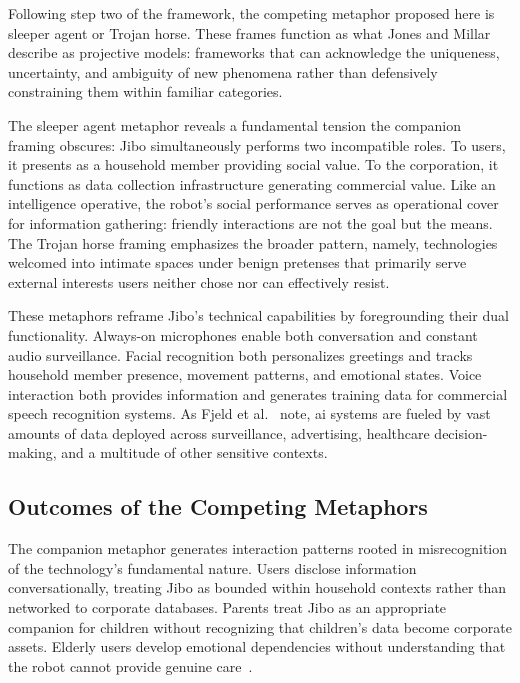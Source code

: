 \documentclass{ieee-portfolio}
\begin{document}
Following step two of the framework, the competing metaphor proposed here is sleeper agent or Trojan horse. These frames function as what Jones and Millar~\cite{jones_hacking_2017} describe as projective models: frameworks that can acknowledge the uniqueness, uncertainty, and ambiguity of new phenomena rather than defensively constraining them within familiar categories.

The sleeper agent metaphor reveals a fundamental tension the companion framing obscures: Jibo simultaneously performs two incompatible roles. To users, it presents as a household member providing social value. To the corporation, it functions as data collection infrastructure generating commercial value. Like an intelligence operative, the robot's social performance serves as operational cover for information gathering: friendly interactions are not the goal but the means. The Trojan horse framing emphasizes the broader pattern, namely, technologies welcomed into intimate spaces under benign pretenses that primarily serve external interests users neither chose nor can effectively resist.

These metaphors reframe Jibo's technical capabilities by foregrounding their dual functionality. Always-on microphones enable both conversation and constant audio surveillance. Facial recognition both personalizes greetings and tracks household member presence, movement patterns, and emotional states. Voice interaction both provides information and generates training data for commercial speech recognition systems. As Fjeld et al.~\cite{fjeld_principled_2020} note, \gls{ai} systems are fueled by vast amounts of data deployed across surveillance, advertising, healthcare decision-making, and a multitude of other sensitive contexts.

\subsection{Outcomes of the Competing Metaphors}

The companion metaphor generates interaction patterns rooted in misrecognition of the technology's fundamental nature. Users disclose information conversationally, treating Jibo as bounded within household contexts rather than networked to corporate databases. Parents treat Jibo as an appropriate companion for children without recognizing that children's data become corporate assets. Elderly users develop emotional dependencies without understanding that the robot cannot provide genuine care~\cite{darling_whos_2015}.
\end{document}
